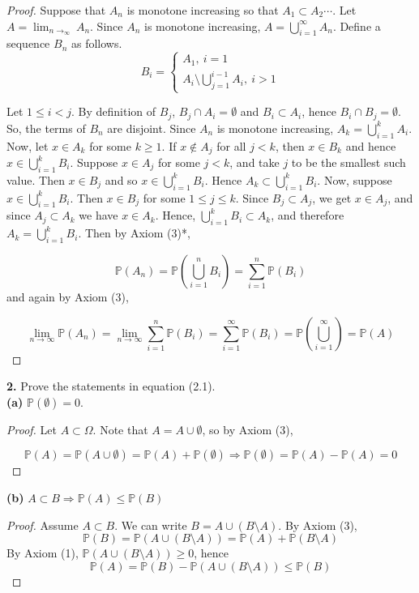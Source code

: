 \documentclass{paper}
\newcommand{\pr}{\mathbb{P}}
\begin{document}
\begin{proof}
Suppose that $A_n$ is monotone increasing so that $A_1\subset A_2\cdots$. Let $A = \lim_{n\to_\infty} A_n$. Since $A_n$ is monotone increasing, $A=\bigcup_{i=1}^{\infty} A_n$. Define a sequence $B_n$ as follows. 
\[
B_i=
\left\{
\begin{array}{l}
A_1,\ i=1\\
A_i \setminus \bigcup_{j=1}^{i-1} A_i,\ i>1
\end{array}
\right.
\]

Let $1\le i < j$. By definition of $B_j$, $B_j\cap A_i=\emptyset$ and $B_i\subset A_i$, hence $B_i\cap B_j=\emptyset$. So, the terms of $B_n$ are disjoint. Since $A_n$ is monotone increasing, $A_k = \bigcup_{i=1}^k A_i$. Now, let $x\in A_k$ for some $k\ge 1$. If $x\notin A_j$ for all $j<k$, then $x\in B_k$ and hence $x\in \bigcup_{i=1}^k B_i$. Suppose $x\in A_j$ for some $j<k$, and take $j$ to be the smallest such value. Then $x\in B_j$ and so $x\in \bigcup_{i=1}^k B_i$. Hence $A_k\subset \bigcup_{i=1}^k B_i$. Now, suppose $x\in \bigcup_{i=1}^k B_i$. Then $x\in B_j$ for some $1\le j\le k$. Since $B_j\subset A_j$, we get $x\in A_j$, and since $A_j\subset A_k$ we have $x\in A_k$. Hence, $\bigcup_{i=1}^k B_i\subset A_k$, and therefore $A_k = \bigcup_{i=1}^k B_i$. Then by Axiom (3)*,

\[
\pr(A_n) = \pr\left(\bigcup_{i=1}^n B_i\right) = \sum_{i=1}^n \pr(B_i)
\]
and again by Axiom (3),

\[
\lim _{n\to\infty} \pr(A_n) 
= \lim_{n\to\infty}\sum_{i=1}^n \pr(B_i) 
= \sum_{i=1}^{\infty} \pr(B_i) 
= \pr\left(\bigcup_{i=1}^{\infty}\right) 
= \pr(A)
\]
\end{proof}



\textbf{2.} Prove the statements in equation (2.1).\\

\textbf{(a)} $\pr(\emptyset) = 0$.
\begin{proof}
Let $A\subset \Omega$. Note that $A = A \cup \emptyset$, so by Axiom (3), 

\[
\pr(A) = \pr(A \cup \emptyset) = \pr(A) + \pr(\emptyset) \Rightarrow \pr(\emptyset) = \pr(A) - \pr(A) = 0
\]
\end{proof}

\textbf{(b)} $A\subset B \Rightarrow \pr(A) \le \pr(B)$

\begin{proof}
Assume $A\subset B$. We can write $B=A\cup (B\setminus A)$. By Axiom (3), 
\[
\pr(B) = \pr(A\cup (B\setminus A)) = \pr(A) + \pr(B\setminus A)
\]
By Axiom (1), $\pr(A\cup (B\setminus A)) \ge 0$, hence
\[
\pr(A) = \pr(B) - \pr(A\cup (B\setminus A)) \le \pr(B)
\]
\end{proof}
\end{document}
